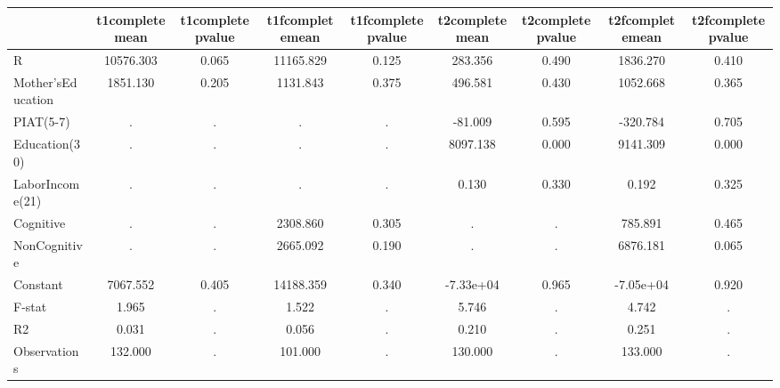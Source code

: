 \begin{table}[htbp]
\begin{tabular}{lcccccccc} \hline \hline
 & t1completemean  & t1completepvalue  & t1fcompletemean  & t1fcompletepvalue  & t2completemean  & t2completepvalue  & t2fcompletemean  & t2fcompletepvalue  \\  \hline 
R & 10576.303 &     0.065 & 11165.829 &     0.125 &   283.356 &     0.490 &  1836.270 &     0.410 \\  
Mother'sEducation &  1851.130 &     0.205 &  1131.843 &     0.375 &   496.581 &     0.430 &  1052.668 &     0.365 \\  
PIAT(5-7) &         . &         . &         . &         . &   -81.009 &     0.595 &  -320.784 &     0.705 \\  
Education(30) &         . &         . &         . &         . &  8097.138 &     0.000 &  9141.309 &     0.000 \\  
LaborIncome(21) &         . &         . &         . &         . &     0.130 &     0.330 &     0.192 &     0.325 \\  
Cognitive &         . &         . &  2308.860 &     0.305 &         . &         . &   785.891 &     0.465 \\  
NonCognitive &         . &         . &  2665.092 &     0.190 &         . &         . &  6876.181 &     0.065 \\  
Constant &  7067.552 &     0.405 & 14188.359 &     0.340 & -7.33e+04 &     0.965 & -7.05e+04 &     0.920 \\  
F-stat &     1.965 &         . &     1.522 &         . &     5.746 &         . &     4.742 &         . \\  
R2 &     0.031 &         . &     0.056 &         . &     0.210 &         . &     0.251 &         . \\  
Observations &   132.000 &         . &   101.000 &         . &   130.000 &         . &   133.000 &         . \\  
\hline \hline \end{tabular}
\end{table}
